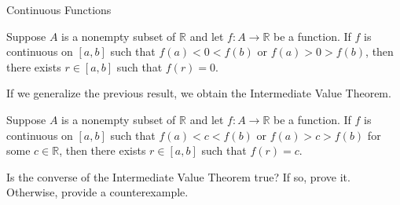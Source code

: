 \begin{section}{Continuous Functions}
\begin{theorem}
Suppose $A$ is a nonempty subset of $\mathbb{R}$ and let $f:A\to \mathbb{R}$ be a function. If $f$ is continuous on $[a,b]$ such that $f(a)<0<f(b)$ or $f(a)>0>f(b)$, then there exists $r\in [a,b]$ such that $f(r)=0$.
\end{theorem}

If we generalize the previous result, we obtain the Intermediate Value Theorem.

\begin{theorem}
Suppose $A$ is a nonempty subset of $\mathbb{R}$ and let $f:A\to \mathbb{R}$ be a function. If $f$ is continuous on $[a,b]$ such that $f(a)<c<f(b)$ or $f(a)>c>f(b)$ for some $c\in \mathbb{R}$, then there exists $r\in [a,b]$ such that $f(r)=c$.
\end{theorem}

\begin{problem}
Is the converse of the Intermediate Value Theorem true? If so, prove it.  Otherwise, provide a counterexample.
\end{problem}

\end{section}